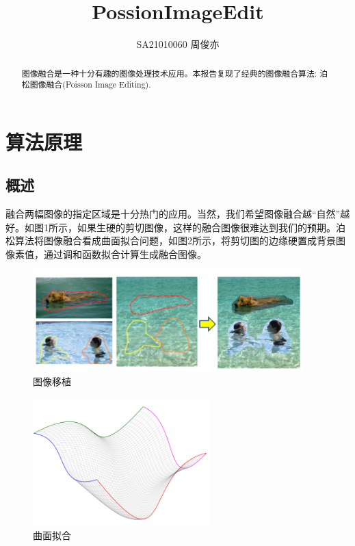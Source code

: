 \documentclass[12pt]{article}
\title{\LARGE\textbf{PossionImageEdit}}
\author{SA21010060 周俊亦}
\date{}
\begin{document}
	\maketitle
	\renewcommand{\abstractname}{Abstract}
	\begin{abstract}
		图像融合是一种十分有趣的图像处理技术应用。本报告复现了经典的图像融合算法: 泊松图像融合(Poisson Image Editing).
	\end{abstract}
	
	\section{算法原理}
		\subsection{概述}
		融合两幅图像的指定区域是十分热门的应用。当然，我们希望图像融合越“自然”越好。如图1所示，如果生硬的剪切图像，这样的融合图像很难达到我们的预期。泊松算法将图像融合看成曲面拟合问题，如图2所示，将剪切图的边缘硬置成背景图像素值，通过调和函数拟合计算生成融合图像。
		
		
		
		\begin{figure}[H]
			\centering
			\includegraphics[width=4.1in]{./ppt0.png}
			\centering
			\caption{图像移植}
		\end{figure}
	
	\begin{figure}[H]
		\centering
		\includegraphics[width=2.7in]{./ppt1.png}
		\centering
		\caption{曲面拟合}
	\end{figure}
	
\end{document}
